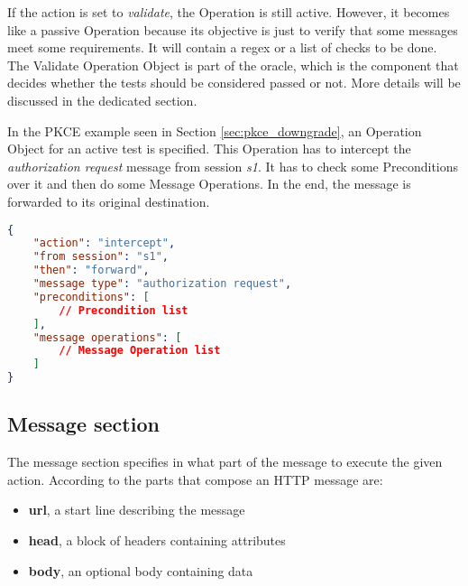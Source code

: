 If the action is set to \textit{validate}, the Operation is still active. However, it becomes like a passive Operation because its objective is just to verify that some messages meet some requirements. It will contain a regex or a list of checks to be done. The Validate Operation Object is part of the oracle, which is the component that decides whether the tests should be considered passed or not. More details will be discussed in the dedicated section.

In the \gls{PKCE} example seen in Section \ref{sec:pkce_downgrade}, an Operation Object for an active test is specified. This Operation has to intercept the \textit{authorization request} message from session \textit{s1}. It has to check some Preconditions over it and then do some Message Operations. In the end, the message is forwarded to its original destination.

\begin{lstlisting}[language=json, caption=Operation definition]
{
    "action": "intercept",
    "from session": "s1",
    "then": "forward",
    "message type": "authorization request",
    "preconditions": [
        // Precondition list
    ],
    "message operations": [
        // Message Operation list
    ]
}
\end{lstlisting}

\subsection{Message section}
The message section specifies in what part of the message to execute the given action.
According to \cite{http} the parts that compose an HTTP message are:
\begin{itemize}
    \item \textbf{url}, a start line describing the message
    \item \textbf{head}, a block of headers containing attributes
    \item \textbf{body}, an optional body containing data
\end{itemize}

